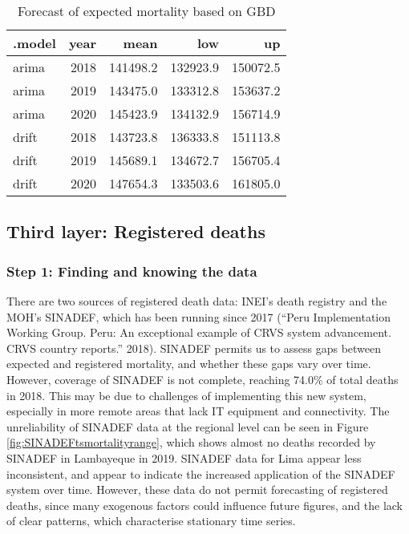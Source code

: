 \documentclass[
]{article}
\begin{document}
\begin{table}[!h]

\caption{\label{tab:gbd}Forecast of expected mortality based on GBD}
\centering
\begin{tabular}[t]{lrrrr}
\toprule
.model & year & mean & low & up\\
\midrule
arima & 2018 & 141498.2 & 132923.9 & 150072.5\\
arima & 2019 & 143475.0 & 133312.8 & 153637.2\\
arima & 2020 & 145423.9 & 134132.9 & 156714.9\\
drift & 2018 & 143723.8 & 136333.8 & 151113.8\\
drift & 2019 & 145689.1 & 134672.7 & 156705.4\\
\addlinespace
drift & 2020 & 147654.3 & 133503.6 & 161805.0\\
\bottomrule
\end{tabular}
\end{table}

\hypertarget{third-layer-registered-deaths}{%
\subsection{Third layer: Registered deaths}\label{third-layer-registered-deaths}}

\hypertarget{step-1-finding-and-knowing-the-data-2}{%
\subsubsection{Step 1: Finding and knowing the data}\label{step-1-finding-and-knowing-the-data-2}}

There are two sources of registered death data: INEI's death registry and the MOH's SINADEF, which has been running since 2017 (``Peru Implementation Working Group. Peru: An exceptional example of CRVS system advancement. CRVS country reports.'' 2018). SINADEF permits us to assess gaps between expected and registered mortality, and whether these gaps vary over time. However, coverage of SINADEF is not complete, reaching 74.0\% of total deaths in 2018. This may be due to challenges of implementing this new system, especially in more remote areas that lack IT equipment and connectivity. The unreliability of SINADEF data at the regional level can be seen in Figure \ref{fig:SINADEFtsmortalityrange}, which shows almost no deaths recorded by SINADEF in Lambayeque in 2019. SINADEF data for Lima appear less inconsistent, and appear to indicate the increased application of the SINADEF system over time. However, these data do not permit forecasting of registered deaths, since many exogenous factors could influence future figures, and the lack of clear patterns, which characterise stationary time series.
\end{document}
